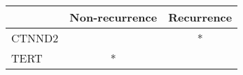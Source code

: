 \begin{tabular}{lcc}
\toprule
{} & Non-recurrence & Recurrence \\
\midrule
CTNND2 &                &          * \\
TERT   &              * &            \\
\bottomrule
\end{tabular}
